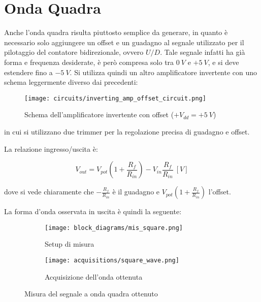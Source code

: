 
\section{Onda Quadra}


Anche l'onda quadra risulta piuttosto semplice da generare, in quanto è necessario solo
aggiungere un offset e un guadagno al segnale utilizzato per il pilotaggio del contatore
bidirezionale, ovvero $U/D$. Tale segnale infatti ha già forma e frequenza desiderate, è però
compresa solo tra $0\ V$ e $+5\ V$, e si deve estendere fino a $-5\ V$.
Si utilizza quindi un altro amplificatore invertente con uno schema leggermente diverso dai
precedenti:

\begin{figure}[H]
    \centering
    \texttt{[image: circuits/inverting\_amp\_offset\_circuit.png]}
    \caption{Schema dell'amplificatore invertente con offset ($+V_{dd}=+5\ V$)}
    \label{inverting_amp_offset_circuit}
\end{figure}

in cui si utilizzano due trimmer per la regolazione precisa di guadagno e offset.

La relazione ingresso/uscita è:

\begin{equation}
    V_{out}=V_{pot}\left(1+\frac{R_f}{R_{in}}\right)-V_{in}\frac{R_f}{R_{in}}\ [V]
\end{equation}

dove si vede chiaramente che $-\frac{R_f}{R_{in}}$ è il guadagno e $V_{pot}\left(1+\frac{R_f}{R_{in}}\right)$
l'offset.

La forma d'onda osservata in uscita è quindi la seguente:

\begin{figure}[H]
    \centering

    \begin{subfigure}{.5\textwidth}
        \centering
        \texttt{[image: block\_diagrams/mis\_square.png]}
        \caption{Setup di misura}
        \label{mis_square}
    \end{subfigure}%
    \begin{subfigure}{.5\textwidth}
        \centering
        \texttt{[image: acquisitions/square\_wave.png]}
        \caption{Acquisizione dell'onda ottenuta}
        \label{acq_square}
    \end{subfigure}

    \caption{Misura del segnale a onda quadra ottenuto}
\end{figure}

